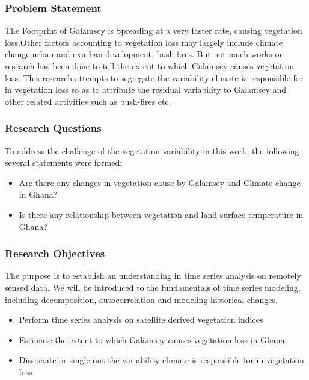 \documentclass[
  letterpaper,
  DIV=11,
  numbers=noendperiod]{scrartcl}
\begin{document}
\hypertarget{problem-statement}{%
\subsubsection{Problem Statement}\label{problem-statement}}

The Footprint of Galamsey is Spreading at a very faster rate, causing
vegetation loss.Other factors accounting to vegetation loss may largely
include climate change,urban and exurban development, bush fires. But
not much works or research has been done to tell the extent to which
Galamsey causes vegetation loss. This research attempts to segregate the
variability climate is responsible for in vegetation loss so as to
attribute the residual variability to Galamsey and other related
activities such as bush-fires etc.

\hypertarget{research-questions}{%
\subsubsection{Research Questions}\label{research-questions}}

To address the challenge of the vegetation variability in this work, the
following several statements were formed:

\begin{itemize}
\item
  Are there any changes in vegetation cause by Galamsey and Climate
  change in Ghana?
\item
  Is there any relationship between vegetation and land surface
  temperature in Ghana?
\end{itemize}

\hypertarget{research-objectives}{%
\subsubsection{Research Objectives}\label{research-objectives}}

The purpose is to establish an understanding in time series analysis on
remotely sensed data. We will be introduced to the fundamentals of time
series modeling, including decomposition, autocorrelation and modeling
historical changes.

\begin{itemize}
\item
  Perform time series analysis on satellite derived vegetation indices
\item
  Estimate the extent to which Galamsey causes vegetation loss in Ghana.
\item
  Dissociate or single out the variability climate is responsible for in
  vegetation loss
\end{itemize}
\end{document}
